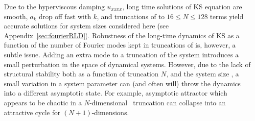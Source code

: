 Due to the hyperviscous damping $u_{xxxx}$, long time solutions of KS
equation are smooth, $a_k$ drop off fast
with $k$, and truncations of  to $16 \leq N \leq 128$
terms yield accurate solutions for system sizes considered here (see
Appendix~\ref{sec:fourierRLD}).  Robustness of the long-time dynamics
of KS as a function of the number of Fourier modes kept in truncations
of  is, however, a subtle issue.  Adding an extra mode to
a truncation of the system introduces a small perturbation in the
space of dynamical systems.  However, due to the lack of structural
stability both as a function of truncation $N$, and the system size
, a small variation in a system parameter can (and often will)
throw the dynamics into a different asymptotic state.  For example,
asymptotic attractor which appears to be chaotic in a $N$-dimensional
\statesp\ truncation can collapse into an attractive cycle
for $(N\!+\!1)$-dimensions.

